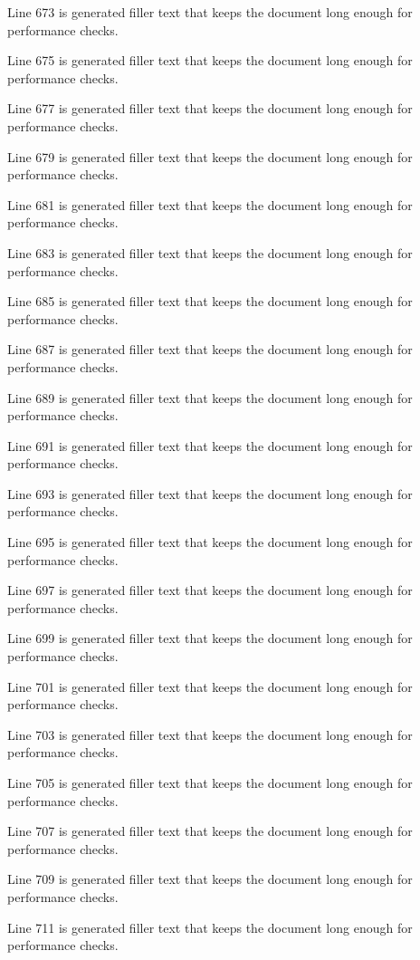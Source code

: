 Line 673 is generated filler text that keeps the document long enough for performance checks.

Line 675 is generated filler text that keeps the document long enough for performance checks.

Line 677 is generated filler text that keeps the document long enough for performance checks.

Line 679 is generated filler text that keeps the document long enough for performance checks.

Line 681 is generated filler text that keeps the document long enough for performance checks.

Line 683 is generated filler text that keeps the document long enough for performance checks.

Line 685 is generated filler text that keeps the document long enough for performance checks.

Line 687 is generated filler text that keeps the document long enough for performance checks.

Line 689 is generated filler text that keeps the document long enough for performance checks.

Line 691 is generated filler text that keeps the document long enough for performance checks.

Line 693 is generated filler text that keeps the document long enough for performance checks.

Line 695 is generated filler text that keeps the document long enough for performance checks.

Line 697 is generated filler text that keeps the document long enough for performance checks.

Line 699 is generated filler text that keeps the document long enough for performance checks.

Line 701 is generated filler text that keeps the document long enough for performance checks.

Line 703 is generated filler text that keeps the document long enough for performance checks.

Line 705 is generated filler text that keeps the document long enough for performance checks.

Line 707 is generated filler text that keeps the document long enough for performance checks.

Line 709 is generated filler text that keeps the document long enough for performance checks.

Line 711 is generated filler text that keeps the document long enough for performance checks.

